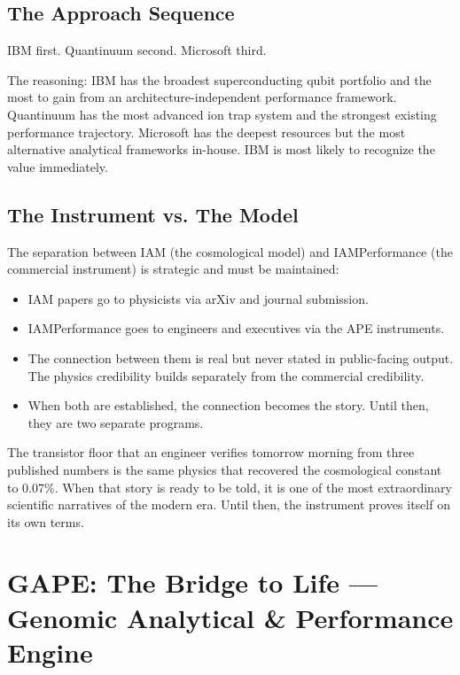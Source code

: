 \documentclass[12pt,a4paper]{article}
\begin{document}
\subsection{The Approach Sequence}

IBM first. Quantinuum second. Microsoft third.

The reasoning: IBM has the broadest superconducting qubit portfolio and the
most to gain from an architecture-independent performance framework. Quantinuum
has the most advanced ion trap system and the strongest existing performance
trajectory. Microsoft has the deepest resources but the most alternative
analytical frameworks in-house. IBM is most likely to recognize the value
immediately.

\subsection{The Instrument vs. The Model}

The separation between IAM (the cosmological model) and IAMPerformance (the
commercial instrument) is strategic and must be maintained:
\begin{itemize}
\item IAM papers go to physicists via arXiv and journal submission.
\item IAMPerformance goes to engineers and executives via the APE instruments.
\item The connection between them is real but never stated in public-facing
  output. The physics credibility builds separately from the commercial
  credibility.
\item When both are established, the connection becomes the story. Until then,
  they are two separate programs.
\end{itemize}

The transistor floor that an engineer verifies tomorrow morning from three
published numbers is the same physics that recovered the cosmological constant
to 0.07\%. When that story is ready to be told, it is one of the most
extraordinary scientific narratives of the modern era. Until then, the
instrument proves itself on its own terms.

\newpage

\section{GAPE: The Bridge to Life --- Genomic Analytical \& Performance Engine}
\label{sec:gape}
\end{document}
